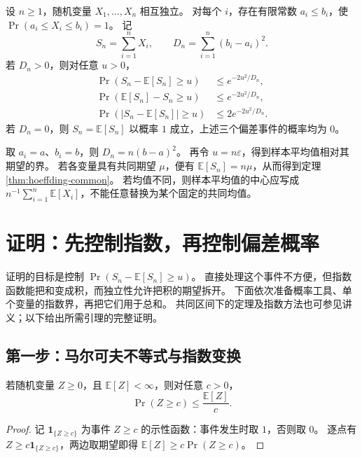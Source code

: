 \documentclass[UTF8,12pt,a4paper,fontset=fandol]{ctexart}
\begin{document}
\begin{theorem}[独立有界随机变量的霍夫丁不等式]
\label{thm:hoeffding-general}
设 $n\geq1$，随机变量 $X_1,\ldots,X_n$ 相互独立。
对每个 $i$，存在有限常数 $a_i\leq b_i$，使 $\Pr(a_i\leq X_i\leq b_i)=1$。
记
\[
  S_n=\sum_{i=1}^{n}X_i,
  \qquad D_n=\sum_{i=1}^{n}(b_i-a_i)^2.
\]
若 $D_n>0$，则对任意 $u>0$，
\begin{align}
  \Pr(S_n-\mathbb E[S_n]\geq u)&\leq e^{-2u^2/D_n},
  \label{eq:hoeffding-sum-upper}\\
  \Pr(\mathbb E[S_n]-S_n\geq u)&\leq e^{-2u^2/D_n},
  \label{eq:hoeffding-sum-lower}\\
  \Pr\!\left(\lvert S_n-\mathbb E[S_n]\rvert\geq u\right)&\leq2e^{-2u^2/D_n}.
  \label{eq:hoeffding-sum-two-sided}
\end{align}
若 $D_n=0$，则 $S_n=\mathbb E[S_n]$ 以概率 $1$ 成立，上述三个偏差事件的概率均为 $0$。
\end{theorem}

取 $a_i=a$、$b_i=b$，则 $D_n=n(b-a)^2$。
再令 $u=n\varepsilon$，得到样本平均值相对其期望的界。
若各变量具有共同期望 $\mu$，便有 $\mathbb E[S_n]=n\mu$，从而得到定理\ref{thm:hoeffding-common}。
若均值不同，则样本平均值的中心应写成
$n^{-1}\sum_{i=1}^{n}\mathbb E[X_i]$，不能任意替换为某个固定的共同均值。

\section{证明：先控制指数，再控制偏差概率}
\label{sec:hoeffding-proof}

证明的目标是控制 $\Pr(S_n-\mathbb E[S_n]\geq u)$。
直接处理这个事件不方便，但指数函数能把和变成积，而独立性允许把积的期望拆开。
下面依次准备概率工具、单个变量的指数界，再把它们用于总和。
共同区间下的定理及指数方法也可参见讲义\cite{duchi-hoeffding}；以下给出所需引理的完整证明。

\subsection{第一步：马尔可夫不等式与指数变换}

\begin{lemma}[马尔可夫不等式]
\label{lem:hoeffding-markov}
若随机变量 $Z\geq0$，且 $\mathbb E[Z]<\infty$，则对任意 $c>0$，
\[
  \Pr(Z\geq c)\leq\frac{\mathbb E[Z]}{c}.
\]
\end{lemma}
\begin{proof}
记 $\mathbf 1_{\{Z\geq c\}}$ 为事件 $Z\geq c$ 的示性函数：事件发生时取 $1$，否则取 $0$。
逐点有 $Z\geq c\mathbf 1_{\{Z\geq c\}}$，两边取期望即得
$\mathbb E[Z]\geq c\Pr(Z\geq c)$。
\end{proof}
\end{document}
